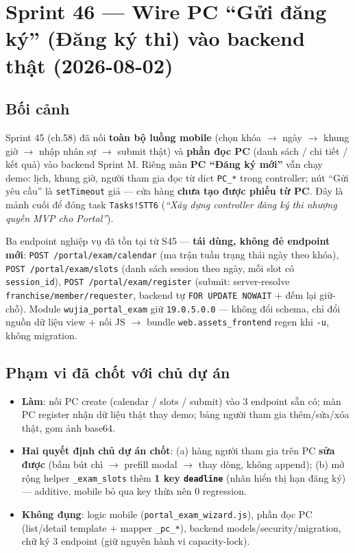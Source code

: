 \chapter{Sprint 46 --- Wire PC ``Gửi đăng ký'' (Đăng ký thi) vào backend thật (2026-08-02)}

\section{Bối cảnh}

Sprint 45 (ch.58) đã nối \textbf{toàn bộ luồng mobile} (chọn khóa $\rightarrow$ ngày
$\rightarrow$ khung giờ $\rightarrow$ nhập nhân sự $\rightarrow$ submit thật) và
\textbf{phần đọc PC} (danh sách / chi tiết / kết quả) vào backend Sprint M. Riêng màn
\textbf{PC ``Đăng ký mới''} vẫn chạy demo: lịch, khung giờ, người tham gia đọc từ dict
\texttt{PC\_*} trong controller; nút ``Gửi yêu cầu'' là \texttt{setTimeout} giả --- cửa
hàng \textbf{chưa tạo được phiếu từ PC}. Đây là mảnh cuối để đóng task
\texttt{Tasks!STT6} (\emph{``Xây dựng controller đăng ký thi nhượng quyền MVP cho
Portal''}).

Ba endpoint nghiệp vụ đã tồn tại từ S45 --- \textbf{tái dùng, không đẻ endpoint mới}:
\texttt{POST /portal/exam/calendar} (ma trận tuần trạng thái ngày theo khóa),
\texttt{POST /portal/exam/slots} (danh sách session theo ngày, mỗi slot có
\texttt{session\_id}), \texttt{POST /portal/exam/register} (submit: server-resolve
\texttt{franchise/member/requester}, backend tự \texttt{FOR UPDATE NOWAIT} $+$ đếm lại
giữ-chỗ). Module \texttt{wujia\_portal\_exam} giữ \texttt{19.0.5.0.0} --- không đổi schema,
chỉ đổi nguồn dữ liệu view $+$ nối JS $\rightarrow$ bundle \texttt{web.assets\_frontend}
regen khi \texttt{-u}, không migration.

\section{Phạm vi đã chốt với chủ dự án}

\begin{itemize}
  \item \textbf{Làm}: nối PC create (calendar / slots / submit) vào 3 endpoint sẵn có; màn
    PC register nhận dữ liệu thật thay demo; bảng người tham gia thêm/sửa/xóa thật, gom
    ảnh base64.
  \item \textbf{Hai quyết định chủ dự án chốt}: (a) hàng người tham gia trên PC
    \textbf{sửa được} (bấm bút chì $\rightarrow$ prefill modal $\rightarrow$ thay dòng, không
    append); (b) mở rộng helper \texttt{\_exam\_slots} thêm \textbf{1 key \texttt{deadline}}
    (nhãn hiển thị hạn đăng ký) --- additive, mobile bỏ qua key thừa nên 0 regression.
  \item \textbf{Không đụng}: logic mobile (\texttt{portal\_exam\_wizard.js}), phần đọc PC
    (list/detail template $+$ mapper \texttt{\_pc\_*}), backend models/security/migration,
    chữ ký 3 endpoint (giữ nguyên hành vi capacity-lock).
\end{itemize}

